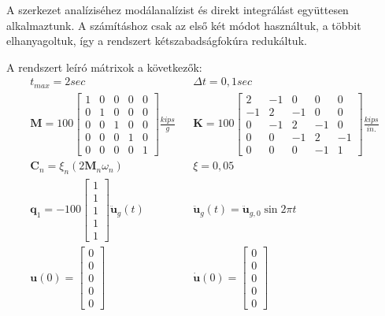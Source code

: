 A szerkezet analíziséhez modálanalízist és direkt integrálást együttesen alkalmaztunk. A számításhoz csak az első két módot használtuk, a többit elhanyagoltuk, így a rendszert kétszabadságfokúra redukáltuk. 

A rendszert leíró mátrixok a következők:
\begin{align*}
  & t_{max}  = 2 sec  & & \Delta{t} = 0,1 sec   & \\
  & \mathbf{M}  = 100\left[\begin{array}{rrrrr}  1 & 0 & 0 & 0 & 0  \\ 0 & 1 & 0 & 0 & 0 \\ 0 & 0 & 1 & 0 & 0 \\ 0 & 0 & 0 & 1 & 0 \\ 0 & 0 & 0 & 0 & 1  \end{array} \right] \frac{kips}{g}   &  & \mathbf{K} = 100 \left[\begin{array}{rrrrr} 2 & -1 & 0 & 0 & 0  \\ -1 & 2 & -1 & 0 & 0 \\ 0 & -1 &2 & -1 & 0 \\ 0 & 0 & -1 & 2 & -1 \\ 0 & 0 & 0 & -1 & 1 \end{array} \right]\frac{kips}{in.}  &  \\
  & \mathbf{C}_n  = \xi_n(2\mathbf{M}_n\omega_n)  &  & \xi = 0,05  & \\
  & \mathbf{q}_1  = -100\left[\begin{array}{c} 1 \\ 1 \\ 1 \\ 1 \\ 1 \end{array} \right]\mathbf{\ddot{u}}_{g}(t) & & \mathbf{\ddot{u}}_{g}(t) = \mathbf{\ddot{u}}_{g,0}\sin{2\pi{t}}  &  \\
  & \mathbf{u}(0)  = \left[\begin{array}{c} 0 \\ 0 \\ 0 \\ 0 \\ 0  \end{array} \right]  & & \mathbf{\dot{u}}(0) = \left[\begin{array}{c} 0 \\ 0 \\ 0 \\ 0 \\ 0 \end{array} \right] & 
  \end{align*}


